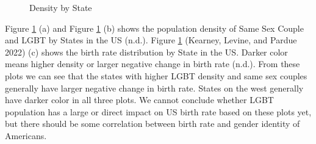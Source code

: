 \documentclass[
]{article}
\begin{document}
\begin{figure}
\newline{}\caption{Density by State}\label{fig:fig-density-state}
\end{figure}

Figure \ref{fig:fig-density-state} (a) and Figure \ref{fig:fig-density-state} (b) shows the population density of Same Sex Couple and LGBT by States in the US (n.d.).
Figure \ref{fig:fig-density-state} (Kearney, Levine, and Pardue 2022) (c) shows the birth rate distribution by State in the US. Darker color means higher density or larger negative change in birth rate (n.d.). From these plots we can see that the states with higher LGBT density and same sex couples generally have larger negative change in birth rate. States on the west generally have darker color in all three plots. We cannot conclude whether LGBT population has a large or direct impact on US birth rate based on these plots yet, but there should be some correlation between birth rate and gender identity of Americans.
\end{document}
